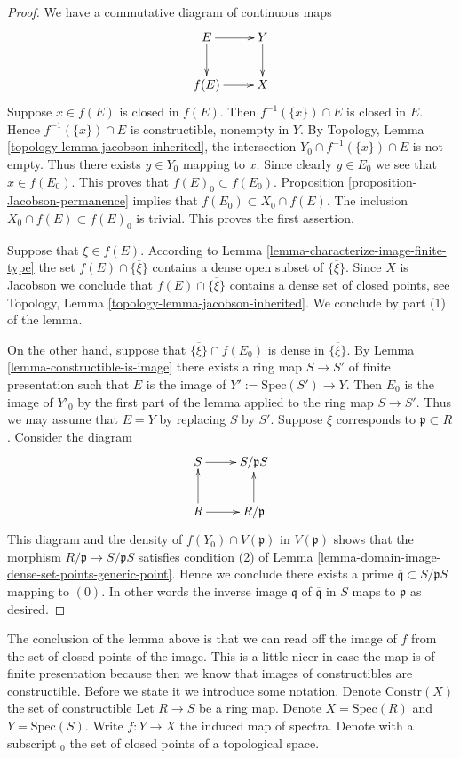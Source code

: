\begin{proof}
We have a commutative diagram of continuous maps
$$
\xymatrix{
E \ar[r] \ar[d] & Y \ar[d] \cr
f(E) \ar[r] & X 
}
$$
Suppose $x \in f(E)$ is closed in $f(E)$. Then $f^{-1}(\{x\})\cap E$
is closed in $E$. Hence $f^{-1}(\{x\})\cap E$ is constructible, nonempty
in $Y$. By Topology, Lemma \ref{topology-lemma-jacobson-inherited},
the intersection $Y_0 \cap f^{-1}(\{x\})\cap E$ is not empty.
Thus there exists $y \in Y_0$ mapping to $x$.
Since clearly $y \in E_0$ we see that $x \in f(E_0)$.
This proves that $f(E)_0 \subset f(E_0)$.
Proposition \ref{proposition-Jacobson-permanence} implies that
$f(E_0) \subset X_0 \cap f(E)$. The inclusion
$X_0 \cap f(E) \subset f(E)_0$ is trivial. This proves the
first assertion.

\medskip\noindent
Suppose that $\xi \in f(E)$. According to
Lemma \ref{lemma-characterize-image-finite-type}
the set $f(E) \cap \overline{\{\xi\}}$ contains a dense
open subset of $\overline{\{\xi\}}$. Since $X$ is Jacobson
we conclude that $f(E) \cap \overline{\{\xi\}}$ contains a
dense set of closed points, see Topology, 
Lemma \ref{topology-lemma-jacobson-inherited}.
We conclude by part (1) of the lemma.

\medskip\noindent
On the other hand, suppose that $\overline{\{\xi\}} \cap f(E_0)$
is dense in $\overline{\{\xi\}}$. By
Lemma \ref{lemma-constructible-is-image}
there exists a ring map $S \to S'$ of finite presentation
such that $E$ is the image of $Y' := \text{Spec}(S') \to Y$.
Then $E_0$ is the image of $Y'_0$ by the first part of the
lemma applied to the ring map $S \to S'$. Thus we may assume that
$E = Y$ by replacing $S$ by $S'$. Suppose $\xi$ corresponds
to $\mathfrak p \subset R$. Consider the diagram
$$
\xymatrix{
S \ar[r] & S/\mathfrak p S \cr
R \ar[r] \ar[u] & R/\mathfrak p \ar[u]
}
$$
This diagram and the density of $f(Y_0) \cap V(\mathfrak p)$ 
in $V(\mathfrak p)$
shows that the morphism $R/\mathfrak p \to S/\mathfrak p S$
satisfies condition (2) of
Lemma \ref{lemma-domain-image-dense-set-points-generic-point}.
Hence we conclude
there exists a prime $\overline{\mathfrak q} \subset S/\mathfrak pS$
mapping to $(0)$. In other words the inverse image $\mathfrak q$
of $\overline{\mathfrak q}$ in $S$ maps to $\mathfrak p$ as desired.
\end{proof}

\noindent
The conclusion of the lemma above is that we can read off
the image of $f$ from the set of closed points of the image.
This is a little nicer in case the map is of finite presentation
because then we know that images of constructibles are constructible.
Before we state it we introduce some notation.
Denote $\text{Constr}(X)$ the set of constructible
Let $R \to S$ be a ring map.
Denote $X = \text{Spec}(R)$ and $Y = \text{Spec}(S)$.
Write $f : Y \to X$ the induced map of spectra.
Denote with a subscript ${}_0$ the set
of closed points of a topological space.


